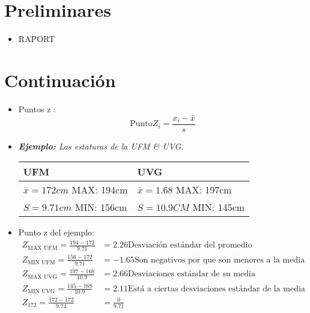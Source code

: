 \section*{Preliminares}
\begin{itemize}
    \item RAPORT
\end{itemize}


\section{Continuación }
\begin{itemize}
    \item Puntos z : 
        \[
          \text{Punto} Z_{i} = \frac{x_{i} - \bar{x}}{s} 
        \]
    
    \item \emph{\textbf{Ejemplo: }Las estaturas de la UFM \& UVG.}
        \begin{center}
           \begin{tabular}{ | p{5cm} | p{5cm} | }
               \hline
                    UFM & UVG    \\
               \hline
                    $\bar{x} = 172cm$ MAX: 194cm & $\bar{x} = 1.68$ MAX: 197cm\\
                    $S = 9.71cm$ MIN: 156cm & $S = 10.9CM$ MIN: 145cm \\ 
                \hline   
           \end{tabular}
        \end{center}
    
    \item Punto z del ejemplo:
        \begin{align*}
            Z_{\text{MAX UFM}} = \frac{194 - 172}{9.71}   &= 2.26 \text{Desviación estándar del promedio} \\ 
            Z_{\text{MIN UFM}} = \frac{156 - 172}{9.71} &= -1.65   \text{Son negativos por que son menores a la media}\\  
            Z_{\text{MAX UVG}} = \frac{197 - 168}{10.9} &= 2.66  \text{Desviaciones estándar de su media} \\  
            Z_{\text{MIN UVG}} = \frac{145 - 168}{10.9} &= 2.11 \text{Está a ciertas desviaciones estándar de la media}\\  
            Z_{172} = \frac{172 - 172}{9.74} &= \frac{0}{9.71} \\   
        \end{align*}
    

\end{itemize}
